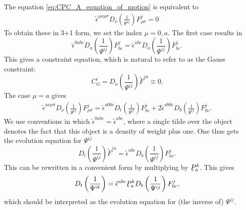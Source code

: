 \documentclass[10pt]{report}
\newcommand{\utilde}[1]{\underaccent{\tilde}{#1}}
\theoremstyle{definition}
\begin{document}
The equation \cref{eq:CPC_A_equation_of_motion} is equivalent to
\begin{align}
    \tilde{\epsilon}^{\mu\nu\rho\sigma} D_\nu \left(\frac{1}{\Psi^{ij}} \right) F^j_{\rho\sigma} = 0
\end{align}
To obtain these in 3+1 form, we set the index $\mu=0,a$. The first case results in 
\begin{equation}
    \tilde{\epsilon}^{0abc} D_a \left(\frac{1}{\Psi^{ij}}\right)F^j_{bc} = \tilde{\epsilon}^{abc} D_a \left(\frac{1}{\Psi^{ij}}\right)F^j_{bc}.
\end{equation}
This gives a constraint equation, which is natural to refer to as the Gauss constraint:
\begin{equation}
    C_G^i = D_a \left(  \frac{1}{\Psi^{ij}} \right) \tilde{F}^{ja} \equiv 0.
    \label{eq:Gauss_constraint}
\end{equation}
The case $\mu = a$ gives
\begin{align}
    \tilde{\epsilon}^{a \nu \rho\sigma} D_\nu \left( \frac{1}{\Psi^{ij}} \right) F^j_{\rho\sigma} = \tilde{\epsilon}^{a0bc} D_t \left( \frac{1}{\Psi^{ij}} \right) F^j_{bc} + 2 \tilde{\epsilon}^{ab0c} D_b \left( \frac{1}{\Psi^{ij}} \right) F^j_{0c}.
\end{align}
We use conventions in which $\tilde{\epsilon}^{0abc}=\tilde{\epsilon}^{abc}$, where a single tilde over the object denotes the fact that this object is a density of weight plus one. One thus gets the evolution equation for $\Psi^{ij}$
\begin{equation}
    D_t \left( \frac{1}{\Psi^{ij}} \right) \tilde{F}^{ja} = \tilde{\epsilon}^{abc} D_b \left( \frac{1}{\Psi^{ij}} \right) F^j_{0c}.
    \label{eq:Inv_Psi_Evolution_Equation}
\end{equation}
This can be rewritten in a convenient form by multiplying by $\utilde{P}^k_a$. This gives
\begin{equation}
    D_t \left( \frac{1}{\Psi^{ik}} \right) = \tilde{\epsilon}^{abc} \utilde{P}^k_a D_b \left( \frac{1}{\Psi^{ij}} \right) F^j_{0c},
    \label{eq:Inv_Psi_Equation_Of_Motion}
\end{equation}
which should be interpreted as the evolution equation for (the inverse of) $\Psi^{ij}$. 
\end{document}
